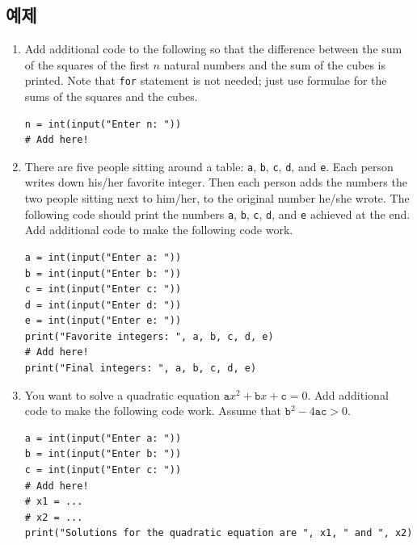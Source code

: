 \documentclass[../main.tex]{subfiles}
\begin{document}
\subsection{예제}
\begin{enumerate}
\item Add additional code to the following so that the difference between the sum of the squares of the first $n$ natural numbers and the sum of the cubes is printed.
Note that \texttt{for} statement is not needed; just use formulae for the sums of the squares and the cubes.
\begin{verbatim}
n = int(input("Enter n: "))
# Add here!
\end{verbatim}

\item There are five people sitting around a table: \texttt{a}, \texttt{b}, \texttt{c}, \texttt{d}, and \texttt{e}.
Each person writes down his/her favorite integer.
Then each person adds the numbers the two people sitting next to him/her, to the original number he/she wrote.
The following code should print the numbers \texttt{a}, \texttt{b}, \texttt{c}, \texttt{d}, and \texttt{e} achieved at the end.
Add additional code to make the following code work.
\begin{verbatim}
a = int(input("Enter a: "))
b = int(input("Enter b: "))
c = int(input("Enter c: "))
d = int(input("Enter d: "))
e = int(input("Enter e: "))
print("Favorite integers: ", a, b, c, d, e)
# Add here!
print("Final integers: ", a, b, c, d, e)
\end{verbatim}

\item You want to solve a quadratic equation $\texttt{a}x^2 + \texttt{b}x + \texttt{c} = 0$.
Add additional code to make the following code work.
Assume that $\texttt{b}^2 - 4\texttt{ac} > 0$.
\begin{verbatim}
a = int(input("Enter a: "))
b = int(input("Enter b: "))
c = int(input("Enter c: "))
# Add here!
# x1 = ...
# x2 = ...
print("Solutions for the quadratic equation are ", x1, " and ", x2)
\end{verbatim}


\end{enumerate}
\end{document}
